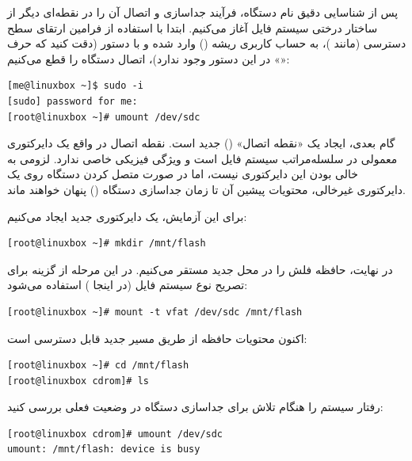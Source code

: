 پس از شناسایی دقیق نام دستگاه، فرآیند جداسازی و اتصال آن را در نقطه‌ای دیگر از ساختار درختی سیستم فایل آغاز می‌کنیم. ابتدا با استفاده از فرامین ارتقای سطح دسترسی (مانند )، به حساب کاربری ریشه () وارد شده و با دستور  (دقت کنید که حرف «» در این دستور وجود ندارد)، اتصال دستگاه را قطع می‌کنیم:

\begin{latin}
\begin{lstlisting}
[me@linuxbox ~]$ sudo -i
[sudo] password for me:
[root@linuxbox ~]# umount /dev/sdc
\end{lstlisting}
\end{latin}

گام بعدی، ایجاد یک «نقطه اتصال» () جدید است. نقطه اتصال در واقع یک دایرکتوری معمولی در سلسله‌مراتب سیستم فایل است و ویژگی فیزیکی خاصی ندارد. لزومی به خالی بودن این دایرکتوری نیست، اما در صورت متصل کردن دستگاه روی یک دایرکتوری غیرخالی، محتویات پیشین آن تا زمان جداسازی دستگاه () پنهان خواهند ماند.

برای این آزمایش، یک دایرکتوری جدید ایجاد می‌کنیم:

\begin{latin}
\begin{lstlisting}
[root@linuxbox ~]# mkdir /mnt/flash
\end{lstlisting}
\end{latin}

در نهایت، حافظه فلش را در محل جدید مستقر می‌کنیم. در این مرحله از گزینه  برای تصریح نوع سیستم فایل (در اینجا ) استفاده می‌شود:

\begin{latin}
\begin{lstlisting}
[root@linuxbox ~]# mount -t vfat /dev/sdc /mnt/flash
\end{lstlisting}
\end{latin}

اکنون محتویات حافظه از طریق مسیر جدید قابل دسترسی است:

\begin{latin}
\begin{lstlisting}
[root@linuxbox ~]# cd /mnt/flash
[root@linuxbox cdrom]# ls
\end{lstlisting}
\end{latin}

رفتار سیستم را هنگام تلاش برای جداسازی دستگاه در وضعیت فعلی بررسی کنید:

\begin{latin}
\begin{lstlisting}
[root@linuxbox cdrom]# umount /dev/sdc
umount: /mnt/flash: device is busy
\end{lstlisting}
\end{latin}

